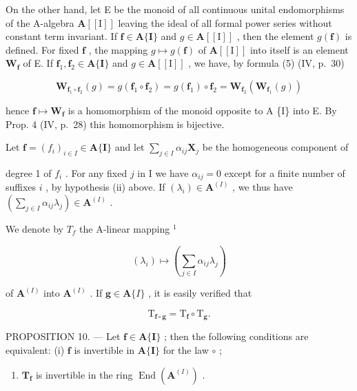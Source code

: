 On the other hand, let E be the monoid of all continuous unital endomorphisms of the A-algebra \(\mathbf{A}[[\mathrm{I}]]\) leaving the ideal of all formal power series without constant term invariant. If \(\mathbf{f} \in \mathbf{A}\{\mathbf{I}\}\) and \(g \in \mathbf{A}[[\mathrm{I}]]\) , then the element \(g(\mathbf{f})\) is defined. For fixed \(\mathbf{f}\) , the mapping \(g \mapsto g(\mathbf{f})\) of \(\mathbf{A}[[\mathrm{I}]]\) into itself is an element \(\mathbf{W}_{\mathbf{f}}\) of E. If \(\mathbf{f}_1, \mathbf{f}_2 \in \mathbf{A}\{\mathbf{I}\}\) and \(g \in \mathbf{A}[[\mathrm{I}]]\) , we have, by formula (5) (IV, p.~30)

\[
\mathbf {W} _ {\mathbf {f} _ {1} \circ \mathbf {f} _ {2}} (g) = g (\mathbf {f} _ {1} \circ \mathbf {f} _ {2}) = g (\mathbf {f} _ {1}) \circ \mathbf {f} _ {2} = \mathbf {W} _ {\mathbf {f} _ {2}} (\mathbf {W} _ {\mathbf {f} _ {1}} (g))
\]

hence \(\mathbf{f} \mapsto \mathbf{W}_{\mathbf{f}}\) is a homomorphism of the monoid opposite to A \{I\} into E. By Prop. 4 (IV, p.~28) this homomorphism is bijective.

Let \(\mathbf{f} = (f_i)_{i\in I}\in \mathbf{A}\{\mathbf{I}\}\) and let \(\sum_{j\in I}\alpha_{ij}\mathbf{X}_j\) be the homogeneous component of

degree 1 of \(f_{i}\) . For any fixed \(j\) in I we have \(\alpha_{ij} = 0\) except for a finite number of suffixes \(i\) , by hypothesis (ii) above. If \((\lambda_i) \in \mathbf{A}^{(I)}\) , we thus have \(\left(\sum_{j \in I} \alpha_{ij} \lambda_j\right) \in \mathbf{A}^{(I)}\) .

We denote by \(T_{f}\) the A-linear mapping \(^{1}\)

\[
\left(\lambda_ {i}\right) \mapsto \left(\sum_ {j \in I} \alpha_ {i j} \lambda_ {j}\right)
\]

of \(\mathbf{A}^{(I)}\) into \(\mathbf{A}^{(I)}\) . If \(\mathbf{g} \in \mathbf{A}\{I\}\) , it is easily verified that

\[
\mathrm{T} _ {\mathbf {f} \circ \mathbf {g}} = \mathrm{T} _ {\mathbf {f}} \circ \mathrm{T} _ {\mathbf {g}}.\tag{28}
\]

PROPOSITION 10. --- Let \(\mathbf{f} \in \mathbf{A}\{\mathbf{I}\}\) ; then the following conditions are equivalent: (i) \(\mathbf{f}\) is invertible in \(\mathbf{A}\{\mathbf{I}\}\) for the law \(\circ\) ;

\begin{enumerate}
\def\labelenumi{(\roman{enumi})}
\setcounter{enumi}{1}
\tightlist
\item
  \(\mathbf{T}_{\mathbf{f}}\) is invertible in the ring \(\operatorname{End}(\mathbf{A}^{(I)})\) .
\end{enumerate}


